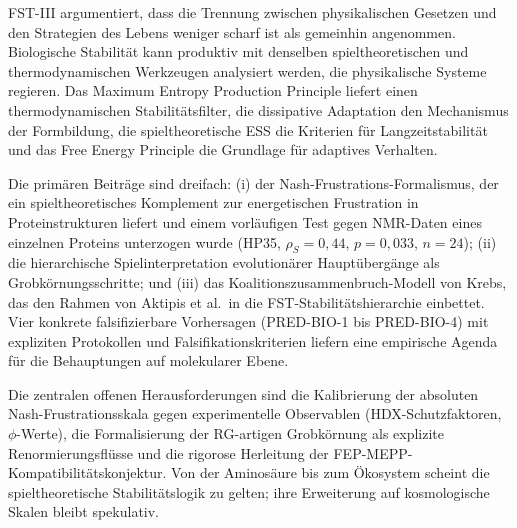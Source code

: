 \documentclass[12pt,a4paper]{article}
\theoremstyle{remark}
\begin{document}
FST-III argumentiert, dass die Trennung zwischen physikalischen Gesetzen und den Strategien des Lebens weniger scharf ist als gemeinhin angenommen. Biologische Stabilit\"at kann produktiv mit denselben spieltheoretischen und thermodynamischen Werkzeugen analysiert werden, die physikalische Systeme regieren. Das Maximum Entropy Production Principle liefert einen thermodynamischen Stabilit\"atsfilter, die dissipative Adaptation den Mechanismus der Formbildung, die spieltheoretische ESS die Kriterien f\"ur Langzeitstabilit\"at und das Free Energy Principle die Grundlage f\"ur adaptives Verhalten.

Die prim\"aren Beitr\"age sind dreifach: (i) der Nash-Frustrations-Formalismus, der ein spieltheoretisches Komplement zur energetischen Frustration in Proteinstrukturen liefert und einem vorl\"aufigen Test gegen NMR-Daten eines einzelnen Proteins unterzogen wurde (HP35, $\rho_S = 0{,}44$, $p = 0{,}033$, $n = 24$); (ii) die hierarchische Spielinterpretation evolution\"arer Haupt\"uberg\"ange als Grobk\"ornungsschritte; und (iii) das Koalitionszusammenbruch-Modell von Krebs, das den Rahmen von Aktipis et al.\ in die FST-Stabilit\"atshierarchie einbettet. Vier konkrete falsifizierbare Vorhersagen (PRED-BIO-1 bis PRED-BIO-4) mit expliziten Protokollen und Falsifikationskriterien liefern eine empirische Agenda f\"ur die Behauptungen auf molekularer Ebene.

Die zentralen offenen Herausforderungen sind die Kalibrierung der absoluten Nash-Frustrationsskala gegen experimentelle Observablen (HDX-Schutzfaktoren, $\phi$-Werte), die Formalisierung der RG-artigen Grobk\"ornung als explizite Renormierungsfl\"usse und die rigorose Herleitung der FEP-MEPP-Kompatibilit\"atskonjektur. Von der Aminos\"aure bis zum \"Okosystem scheint die spieltheoretische Stabilit\"atslogik zu gelten; ihre Erweiterung auf kosmologische Skalen \citep{FST-Unified2026} bleibt spekulativ.

\end{document}
